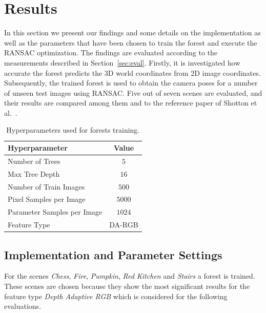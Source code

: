 \documentclass[final]{cvpr}
\begin{document}

\section{Results}
In this section we present our findings and some details on the implementation as well as the parameters that
have been chosen to train the forest and execute the RANSAC optimization. The findings are evaluated according to the measurements described
in Section~\ref{sec:eval}. Firstly, it is investigated how accurate the 
forest predicts the 3D world coordinates from 2D image coordinates. Subsequently, the trained forest is used to obtain 
the camera poses for a number of unseen test images using RANSAC. Five out of seven scenes 
are evaluated, and their results are compared among them and to the reference paper of Shotton et al.~\cite{shotton2013}. 

\begin{table}[h!]
	\begin{center}
	\begin{tabular}{|l|c|}
	\hline
	Hyperparameter & Value \\
	\hline\hline
	Number of Trees & $5$ \\
	Max Tree Depth & $16$ \\
	Number of Train Images & $500$ \\
	Pixel Samples per Image & $5000$ \\
	Parameter Samples per Image  & $1024$ \\
	Feature Type & DA-RGB \\
	\hline
	\end{tabular}
	\end{center}
	\caption{Hyperparameters used for forests training.}
	\label{tab:params-forest}
\end{table}

\subsection{Implementation and Parameter Settings}
For the scenes \textit{Chess}, \textit{Fire},  \textit{Pumpkin},  \textit{Red Kitchen} and  \textit{Stairs} a forest is
trained. These scenes are chosen because they show the most significant results for the feature type \textit{Depth Adaptive RGB} 
which is considered for the following evaluations.
\end{document}

